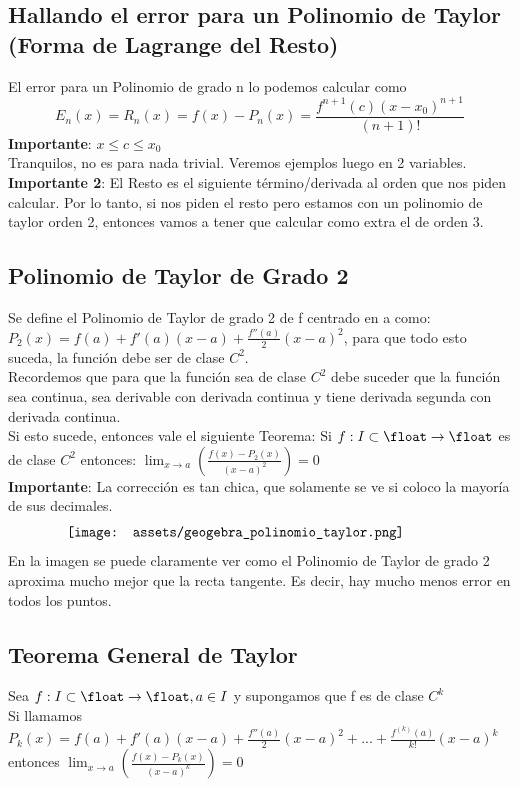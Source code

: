 \documentclass[10pt,a4paper]{article}
\begin{document}
\subsection*{Hallando el error para un Polinomio de Taylor (Forma de Lagrange del Resto)}
El error para un Polinomio de grado n lo podemos calcular como 
\[E_{n}(x) = R_{n}(x) = f(x) - P_{n}(x) = \frac{f^{n+1}(c)(x-x_{0})^{n+1}}{(n+1)!}\]
\textbf{Importante}: $x \le c \le x_{0}$ \\
Tranquilos, no es para nada trivial. Veremos ejemplos luego en 2 variables. \\
\textbf{Importante 2}: El Resto es el siguiente término/derivada al orden que nos piden calcular. Por lo tanto, si nos piden el resto pero estamos con un polinomio de taylor orden 2, entonces vamos a tener que calcular como extra el de orden 3.
\subsection*{Polinomio de Taylor de Grado 2}
Se define el Polinomio de Taylor de grado 2 de f centrado en a como: $P_{2}(x) = f(a) + f'(a)(x-a)+\frac{f''(a)}{2}(x-a)^{2}$, para que todo esto suceda, la función debe ser de clase $C^{2}$. \\
Recordemos que para que la función sea de clase $C^{2}$ debe suceder que la función sea continua, sea derivable con derivada continua y tiene derivada segunda con derivada continua. \\
Si esto sucede, entonces vale el siguiente Teorema: Si $f:I \subset \float \rightarrow \float$ es de clase $C^{2}$ entonces: $\lim_{x \to a} \left(\frac{f(x) - P_{2}(x)}{(x-a)^{2}}  \right) = 0$ \\
\textbf{Importante}: La corrección es tan chica, que solamente se ve si coloco la mayoría de sus decimales.
\[\begin{minipage}[b]{0.8\textwidth}
    \texttt{[image: assets/geogebra\_polinomio\_taylor.png]}
\end{minipage}\]
En la imagen se puede claramente ver como el Polinomio de Taylor de grado 2 aproxima mucho mejor que la recta tangente. Es decir, hay mucho menos error en todos los puntos.
\subsection*{Teorema General de Taylor}
Sea $f:I \subset \float \rightarrow \float, a \in I$ y supongamos que f es de clase $C^{k}$ \\
Si llamamos $P_{k}(x) = f(a) + f'(a)(x-a) + \frac{f''(a)}{2}(x-a)^{2} + ... + \frac{f^{(k)}(a)}{k!}(x-a)^{k}$ entonces $\lim_{x \to a} \left(\frac{f(x) - P_{k}(x)}{(x-a)^{k}}  \right) = 0$
\end{document}
